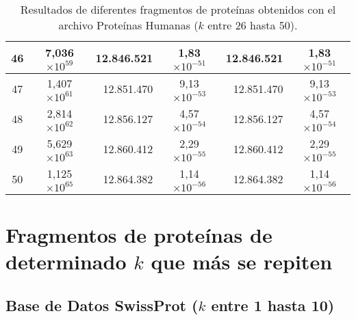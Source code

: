 \begin{table}[!hbt]
\begin{tabular}{| c  r  r  c  r  c |}
    46 & \multicolumn{1}{c}{7,036$\times 10^{59}$} & 12.846.521  & 1,83$\times 10^{-51}$ & 12.846.521  & 1,83$\times 10^{-51}$ \\ \hline  
    47 & \multicolumn{1}{c}{1,407$\times 10^{61}$} & 12.851.470  & 9,13$\times 10^{-53}$ & 12.851.470  & 9,13$\times 10^{-53}$ \\ \hline
    48 & \multicolumn{1}{c}{2,814$\times 10^{62}$} & 12.856.127  & 4,57$\times 10^{-54}$ & 12.856.127  & 4,57$\times 10^{-54}$ \\ \hline  
    49 & \multicolumn{1}{c}{5,629$\times 10^{63}$} & 12.860.412  & 2,29$\times 10^{-55}$ & 12.860.412  & 2,29$\times 10^{-55}$ \\ \hline
    50 & \multicolumn{1}{c}{1,125$\times 10^{65}$} & 12.864.382  & 1,14$\times 10^{-56}$ & 12.864.382  & 1,14$\times 10^{-56}$ \\ \hline       
    \end{tabular}
    \caption{Resultados de diferentes fragmentos de proteínas obtenidos con el archivo Proteínas Humanas ($k$ entre 26 hasta 50).}
    \label{tb:label42}
\end{table}

\newpage

\section*{Fragmentos de proteínas de determinado $k$ que más se repiten}

\subsection*{Base de Datos SwissProt ($k$ entre 1 hasta 10)}

